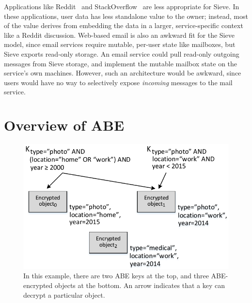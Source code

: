Applications like Reddit~\cite{reddit} 
and StackOverflow~\cite{soverflow} are
less appropriate for Sieve. In these applications,
user data has less standalone value to the
owner; instead, most of the value derives from
embedding the data in a larger, service-specific
context like a Reddit discussion.
Web-based email is also an awkward fit for the
Sieve model, since email services require mutable,
per-user state like mailboxes, but Sieve exports
read-only storage. An email service could pull
read-only outgoing messages from Sieve storage,
and implement the mutable mailbox state on the
service's own machines. However, such an
architecture would be awkward, since users
would have no way to selectively expose
\emph{incoming} messages to the mail service.

\section{Overview of ABE}
\label{sec:abeOverview}

\begin{figure}
  \centering
     \includegraphics{figs/abeExample.pdf}
     \caption[ABE Example]{In this example, there are two ABE keys at the
              top, and three ABE-encrypted objects at the bottom.
              An arrow indicates that a key can decrypt a particular
              object.}
  \label{fig:abeExample}
\end{figure}

